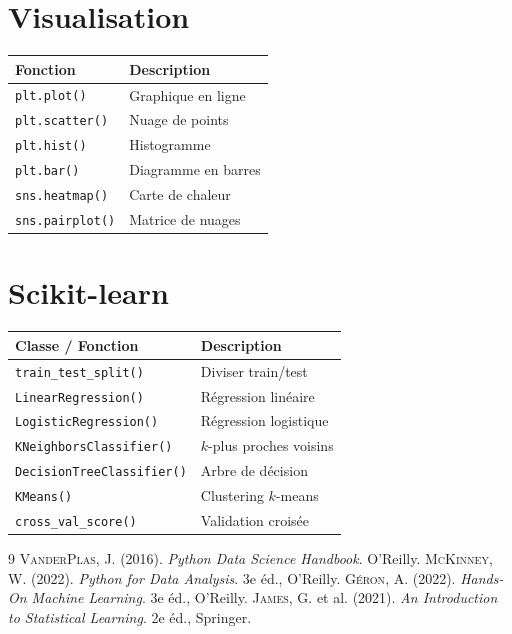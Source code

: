 \documentclass[12pt,a4paper,twoside]{book}
\theoremstyle{definition}
\theoremstyle{plain}
\theoremstyle{remark}
\newcommand{\py}[1]{\texttt{#1}}
\begin{document}
\section{Visualisation}
\begin{tabular}{ll}
\toprule
\textbf{Fonction} & \textbf{Description} \\
\midrule
\py{plt.plot()} & Graphique en ligne \\
\py{plt.scatter()} & Nuage de points \\
\py{plt.hist()} & Histogramme \\
\py{plt.bar()} & Diagramme en barres \\
\py{sns.heatmap()} & Carte de chaleur \\
\py{sns.pairplot()} & Matrice de nuages \\
\bottomrule
\end{tabular}

\section{Scikit-learn}
\begin{tabular}{ll}
\toprule
\textbf{Classe / Fonction} & \textbf{Description} \\
\midrule
\py{train_test_split()} & Diviser train/test \\
\py{LinearRegression()} & R\'egression lin\'eaire \\
\py{LogisticRegression()} & R\'egression logistique \\
\py{KNeighborsClassifier()} & $k$-plus proches voisins \\
\py{DecisionTreeClassifier()} & Arbre de d\'ecision \\
\py{KMeans()} & Clustering $k$-means \\
\py{cross_val_score()} & Validation crois\'ee \\
\bottomrule
\end{tabular}

\begin{thebibliography}{9}
 \textsc{VanderPlas}, J. (2016). \emph{Python Data Science Handbook}. O'Reilly.
 \textsc{McKinney}, W. (2022). \emph{Python for Data Analysis}. 3e \'ed., O'Reilly.
 \textsc{G\'eron}, A. (2022). \emph{Hands-On Machine Learning}. 3e \'ed., O'Reilly.
 \textsc{James}, G. et al. (2021). \emph{An Introduction to Statistical Learning}. 2e \'ed., Springer.
\end{thebibliography}

\printindex
\end{document}
